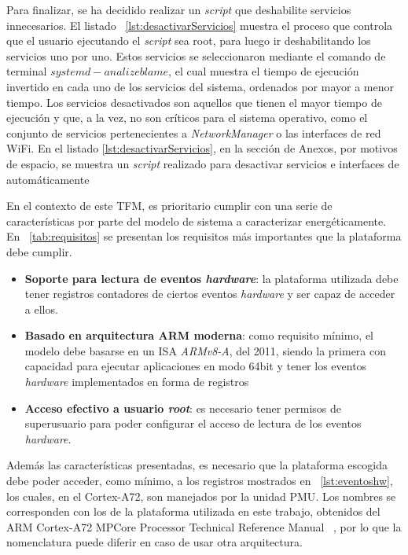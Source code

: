 Para finalizar, se ha decidido realizar un \textit{script} que deshabilite servicios innecesarios. El listado ~\ref{lst:desactivarServicios} muestra el proceso que controla que el usuario ejecutando el \textit{script} sea root, para luego ir deshabilitando los servicios uno por uno. Estos servicios se seleccionaron mediante el comando de terminal $systemd-analize blame$, el cual muestra el tiempo de ejecución invertido en cada uno de los servicios del sistema, ordenados por mayor a menor tiempo. Los servicios desactivados son aquellos que tienen el mayor tiempo de ejecución y que, a la vez, no son críticos para el sistema operativo, como el conjunto de servicios pertenecientes a \textit{NetworkManager} \cite{networkmanager} o las interfaces de red \ac{WiFi}. En el listado \ref{lst:desactivarServicios}, en la sección de Anexos, por motivos de espacio, se muestra un \textit{script} realizado para desactivar servicios e interfaces de automáticamente

En el contexto de este \ac{TFM}, es prioritario cumplir con una serie de características por parte del modelo de sistema a caracterizar energéticamente. En ~\ref{tab:requisitos} se presentan los requisitos más importantes que la plataforma debe cumplir.

\begin{itemize}[noitemsep]
    \item \label{tab:requisitos}\textbf{Soporte para lectura de eventos \textit{hardware}}: la plataforma utilizada debe tener registros contadores de ciertos eventos \textit{hardware} y ser capaz de acceder a ellos.

    \item \textbf{Basado en arquitectura \ac{ARM} moderna}: como requisito mínimo, el modelo debe basarse en un \ac{ISA} \textit{ARMv8-A}, del 2011, siendo la primera con capacidad para ejecutar aplicaciones en modo 64bit y tener los eventos \textit{hardware} implementados en forma de registros \cite{arm-a}

    \item \textbf{Acceso efectivo a usuario \textit{root}}: es necesario tener permisos de superusuario para poder configurar el acceso de lectura de los eventos \textit{hardware}.
\end{itemize}

Además las características presentadas, es necesario que la plataforma escogida debe poder acceder, como mínimo, a los registros mostrados en ~\ref{lst:eventoshw}, los cuales, en el Cortex-A72, son manejados por la unidad \ac{PMU}. Los nombres se corresponden con los de la plataforma utilizada en este trabajo, obtenidos del \ac{ARM} Cortex-A72 MPCore Processor Technical Reference Manual ~\cite{referencia-a72}, por lo que la nomenclatura puede diferir en caso de usar otra arquitectura.

